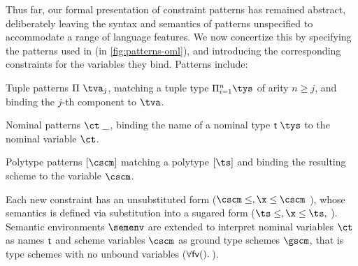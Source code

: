 \documentclass[acmsmall,screen,nonacm,review]{acmart}
\begin{document}
Thus far, our formal presentation of constraint patterns has remained
abstract, deliberately leaving the syntax and semantics of patterns unspecified to
accommodate a range of language features. We now concertize this by specifying
the patterns used in \OML (in \cref{fig:patterns-oml}), and introducing the
corresponding constraints for the variables they bind.
%
Patterns include:
\begin{enumerate*}

  \item Tuple patterns $\cpatprod \tv j$, matching a tuple type $\Pi\iton
    \tys$ of arity $n \geq j$, and binding the $j$-th component to $\tv$.

  \item Nominal patterns $\cpatrcd \ct$, binding the name of a nominal type
    $\Tapp \tys$ to the nominal variable $\ct$.

  \item Polytype patterns $\cpatpoly \cscm$ matching a polytype $\tpoly \ts$ and
    binding the resulting scheme to the variable $\cscm$.

\end{enumerate*}

Each new constraint has an unsubstituted form ($\cscm \leq \t, \x \leq \cscm$
\etc), whose semantics is defined via substitution into a sugared form ($\ts
\leq \t, \x \leq \ts,$ \etc). Semantic environments $\semenv$ are extended to
interpret nominal variables $\ct$ as names $\mathopen{}\mathrel{\mathsf{t}}$ and scheme variables $\cscm$ as
ground type schemes $\gscm$, that is type schemes with no unbound variables
(\ie $\forall {\mathsf{fv}({\relax})}.\,{\relax}$).
\end{document}
